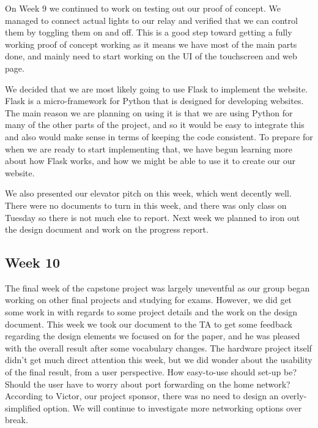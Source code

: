 \documentclass[letterpaper,10pt]{article}
\begin{document}
On Week 9 we continued to work on testing out our proof of concept. We managed
to connect actual lights to our relay and verified that we can control them by
toggling them on and off. This is a good step toward getting a fully working
proof of concept working as it means we have most of the main parts done, and
mainly need to start working on the UI of the touchscreen and web page.

We decided that we are most likely going to use Flask to implement the website.
Flask is a micro-framework for Python that is designed for developing websites.
The main reason we are planning on using it is that we are using Python for
many of the other parts of the project, and so it would be easy to integrate
this and also would make sense in terms of keeping the code consistent. To
prepare for when we are ready to start implementing that, we have begun
learning more about how Flask works, and how we might be able to use it to
create our our website.

We also presented our elevator pitch on this week, which went decently well.
There were no documents to turn in this week, and there was only class on
Tuesday so there is not much else to report. Next week we planned to iron out
the design document and work on the progress report. 

\subsection{Week 10}

The final week of the capstone project was largely uneventful as our group
began working on other final projects and studying for exams. However, we did
get some work in with regards to some project details and the work on the
design document.  This week we took our document to the TA to get some feedback
regarding the design elements we focused on for the paper, and he was pleased
with the overall result after some vocabulary changes.  The hardware project
itself didn't get much direct attention this week, but we did wonder about the
usability of the final result, from a user perspective.  How easy-to-use should
set-up be? Should the user have to worry about port forwarding on the home
network?  According to Victor, our project sponsor, there was no need to design
an overly-simplified option.  We will continue to investigate more networking
options over break.
\end{document}

